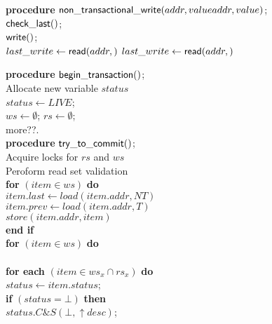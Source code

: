 \documentclass[11pt]{article}
\begin{document}
\begin{figure}[htb]
{{\begin{minipage}[t]{150mm}
\begin{tabbing}
{\bf procedure}  ${\sf non\_transactional\_write}(addr, valueaddr, value)$;\\
 \> ${\sf check\_last}()$; \\
 \> ${\sf write}()$; \\
 \> $last\_write \gets {\sf read}(addr, \mathit{})$
 \> $last\_write \gets {\sf read}(addr, \mathit{})$

{\bf procedure}  ${\sf begin\_transaction}()$;\\
 \> Allocate new variable $status$ \\
 \> $status \gets \mathit{LIVE}$; \\
 \> $ws \gets \emptyset$; $rs \gets \emptyset$; \\
 \> more??. \\

{\bf procedure}  ${\sf try\_to\_commit}()$;\\
 \> Acquire locks for $rs$ and $ws$ \\
 \> Peroform read set validation \\
 \> {\bf for} $(item \in ws)$ {\bf do} \\
 \>\> $item.last \gets load(item.addr, NT)$ \\
 \>\> $item.prev \gets load(item.addr, T)$ \\
 \>\> $store(item.addr, item)$ \\
 \> {\bf end if} \\
 \> {\bf for} $(item \in ws)$ {\bf do} \\
 \>\> \\



 \> {\bf for each} $(item \in ws_x \cap rs_x)$ {\bf do} \\

 \>\> $status \gets item.status$; \\

 \>\> {\bf if} $(status = \bot)$ {\bf then} \\

 \>\>\> $status.C\&S(\bot, \uparrow desc)$; \\


\end{tabbing}
\end{minipage}}}
\end{figure}
\end{document}
